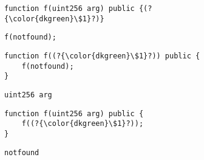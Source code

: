 \begin{figure}[h!]
\vspace{-2.0em}
\begin{subfigure}{.64\columnwidth}
\begin{lstlisting}[basicstyle=\scriptsize\ttfamily,numbers=none,xleftmargin=0.7em,xrightmargin=0em]
function f(uint256 arg) public {(?{\color{dkgreen}\$1}?)}
\end{lstlisting}
\end{subfigure}\hspace{.5em}
\begin{subfigure}{.26\columnwidth}
\begin{lstlisting}[basicstyle=\scriptsize\ttfamily,numbers=none,xleftmargin=0.7em,xrightmargin=0em]
f(notfound);
\end{lstlisting}
\end{subfigure}

\begin{subfigure}{.64\columnwidth}
\begin{lstlisting}[basicstyle=\scriptsize\ttfamily,numbers=none,xleftmargin=0.7em,xrightmargin=0em]
function f((?{\color{dkgreen}\$1}?)) public {
    f(notfound);
} 
\end{lstlisting}
\end{subfigure}\hspace{.5em}
\begin{subfigure}{.26\columnwidth}
\begin{lstlisting}[basicstyle=\scriptsize\ttfamily,numbers=none,xleftmargin=0.7em,xrightmargin=0em]
uint256 arg
\end{lstlisting}
\vspace{1.5em}
\end{subfigure}

\begin{subfigure}{.64\columnwidth}
\begin{lstlisting}[basicstyle=\scriptsize\ttfamily,numbers=none,xleftmargin=0.7em,xrightmargin=0em]
function f(uint256 arg) public {
    f((?{\color{dkgreen}\$1}?));
} 
\end{lstlisting}
\end{subfigure}\hspace{.5em}
\begin{subfigure}{.26\columnwidth}
\begin{lstlisting}[basicstyle=\scriptsize\ttfamily,numbers=none,xleftmargin=0.7em,xrightmargin=0em]
notfound
\end{lstlisting}
\vspace{1.5em}
\end{subfigure}
\end{figure}

